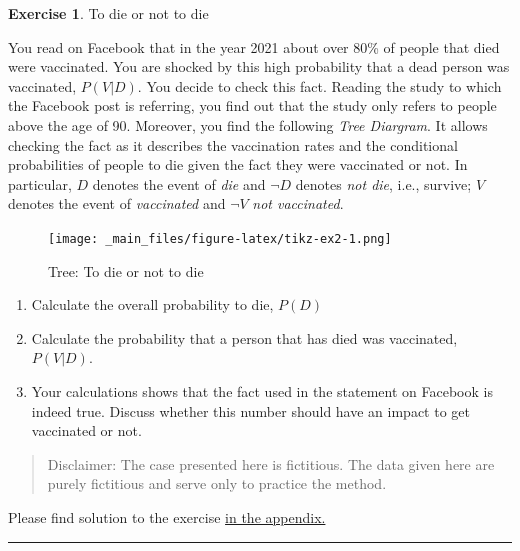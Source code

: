 \documentclass[
  12pt,
  oneside]{book}
\providecommand{\tightlist}{%
  \setlength{\itemsep}{0pt}\setlength{\parskip}{0pt}}
\theoremstyle{definition}
\theoremstyle{definition}
\theoremstyle{definition}
\newtheorem{exercise}{Exercise}[chapter]
\theoremstyle{definition}
\theoremstyle{remark}
\begin{document}
\begin{exercise}
\protect\hypertarget{exr:todieornot}{}\label{exr:todieornot}To die or not to die

You read on Facebook that in the year 2021 about over 80\% of people that died were vaccinated. You are shocked by this high probability that a dead person was vaccinated, \(P(V|D)\). You decide to check this fact. Reading the study to which the Facebook post is referring, you find out that the study only refers to people above the age of 90. Moreover, you find the following \emph{Tree Diargram}. It allows checking the fact as it describes the vaccination rates and the conditional probabilities of people to die given the fact they were vaccinated or not.
In particular, \(D\) denotes the event of \emph{die} and \(\neg D\) denotes \emph{not die}, i.e., survive; \(V\) denotes the event of \emph{vaccinated} and \(\neg V\) \emph{not vaccinated}.
\end{exercise}

\begin{figure}
\centering
\texttt{[image: \_main\_files/figure-latex/tikz-ex2-1.png]}
\caption{\label{fig:tikz-ex2}Tree: To die or not to die}
\end{figure}

\begin{enumerate}
\def\labelenumi{\alph{enumi})}
\tightlist
\item
  Calculate the overall probability to die, \(P(D)\)
\item
  Calculate the probability that a person that has died was vaccinated, \(P(V|D)\).
\item
  Your calculations shows that the fact used in the statement on Facebook is indeed true. Discuss whether this number should have an impact to get vaccinated or not.
\end{enumerate}

\begin{quote}
Disclaimer: The case presented here is fictitious. The data given here are purely fictitious and serve only to practice the method.
\end{quote}

Please find solution to the exercise \hyperref[sol:todieornot]{in the appendix.}

\begin{center}\rule{0.5\linewidth}{0.5pt}\end{center}

\begin{verbatim}
\end{verbatim}
\end{document}
